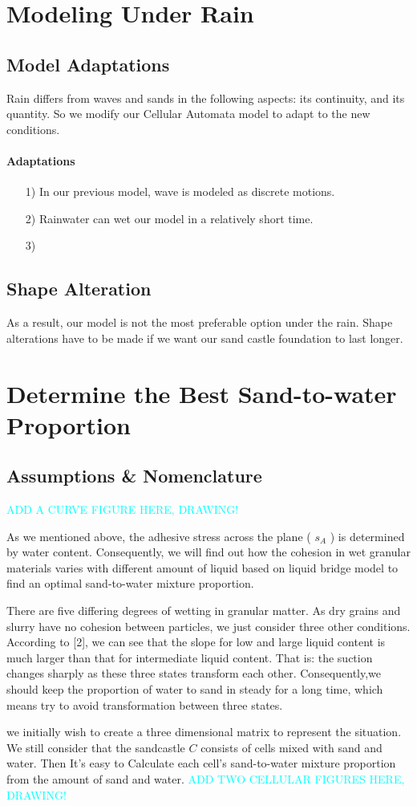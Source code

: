 \documentclass[12pt]{article}
\begin{document}
\section{Modeling Under Rain}
\subsection{Model Adaptations}
Rain differs from waves and sands in the following aspects: its continuity, and its quantity. So we modify our Cellular Automata model to adapt to the new conditions.
\paragraph{Adaptations}
\begin{itemize}
    \item [1)]
          In our previous model, wave is modeled as discrete motions.
    \item [2)]
          Rainwater can wet our model in a relatively short time.
    \item [3)]

\end{itemize}
\subsection{Shape Alteration}
As a result, our model is not the most preferable option under the rain. Shape alterations have to be made if we want our sand castle foundation to last longer.
\section{Determine the Best Sand-to-water Proportion}
\subsection{Assumptions \& Nomenclature}
\textcolor{cyan}{ADD A CURVE FIGURE HERE, DRAWING!}
\par
As we mentioned above, the adhesive stress across the plane ( $s_A$ ) is determined by water content. Consequently, we will find out how the cohesion in wet granular materials varies with different amount of liquid based on liquid bridge model to find an optimal sand-to-water mixture proportion.
\par
There are five differing degrees of wetting in granular matter. As dry grains and slurry have no cohesion between particles, we just consider three other conditions. According to [2], we can see that the slope for low and large liquid content is much larger than that for intermediate liquid content. That is: the suction changes sharply as these three states transform each other. Consequently,we should keep the proportion of water to sand in steady for a long time, which means try to avoid transformation between three states.
\par
we initially wish to create a three dimensional matrix to represent the situation. We still consider that the sandcastle $C$ consists of cells mixed with sand and water. Then It's easy to Calculate each cell’s sand-to-water mixture proportion from the amount of sand and water.
\textcolor{cyan}{ADD TWO CELLULAR FIGURES HERE, DRAWING!}
\end{document}
